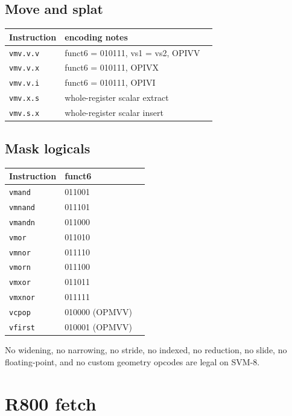 \subsection{Move and splat}

\begin{center}
\begin{tabular}{@{}llc@{}}
\toprule
Instruction & encoding notes \\
\midrule
\texttt{vmv.v.v} & funct6 = 010111, vs1 = vs2, OPIVV \\
\texttt{vmv.v.x} & funct6 = 010111, OPIVX \\
\texttt{vmv.v.i} & funct6 = 010111, OPIVI \\
\texttt{vmv.x.s} & whole-register scalar extract \\
\texttt{vmv.s.x} & whole-register scalar insert \\
\bottomrule
\end{tabular}
\end{center}

\subsection{Mask logicals}

\begin{center}
\begin{tabular}{@{}llc@{}}
\toprule
Instruction & funct6 \\
\midrule
\texttt{vmand}  & 011001 \\
\texttt{vmnand} & 011101 \\
\texttt{vmandn} & 011000 \\
\texttt{vmor}   & 011010 \\
\texttt{vmnor}  & 011110 \\
\texttt{vmorn}  & 011100 \\
\texttt{vmxor}  & 011011 \\
\texttt{vmxnor} & 011111 \\
\texttt{vcpop}  & 010000 (OPMVV) \\
\texttt{vfirst} & 010001 (OPMVV) \\
\bottomrule
\end{tabular}
\end{center}

No widening, no narrowing, no stride, no indexed, no reduction, no slide, no floating-point, and no custom geometry opcodes are legal on SVM-8.

\section{R800 fetch}

